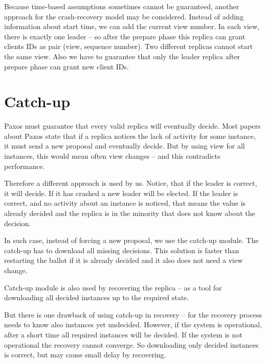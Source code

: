 Because time-based assumptions sometimes cannot be guaranteed, another approach for the crash-recovery model may be considered. Instead of adding information about start time, we can add the current view number. In each view, there is exactly one leader -- so after the prepare phase this replica can grant clients IDs as pair (view, sequence number). Two different replicas cannot start the same view.
Also we have to guarantee that only the leader replica after prepare phase can grant new client IDs.

\section{Catch-up}
\label{sec:catch_up}

Paxos must guarantee that every valid replica will eventually decide. Most papers about Paxos state that if a replica notices the lack of activity for some instance, it must send a new proposal and eventually decide. But by using view for all instances, this would mean often view changes -- and this contradicts performance.

Therefore a different approach is used by us. Notice, that if the leader is correct, it will decide. If it has crashed a new leader will be elected. If the leader is correct, and no activity about an instance is noticed, that means the value is already decided and the replica is in the minority that does not know about the decision.

In such case, instead of forcing a new proposal, we use the catch-up module.
The catch-up has to download all missing decisions. This solution is faster than restarting the ballot if it is already decided and it also does not need a view change.


Catch-up module is also used by recovering the replica -- as a tool for downloading all decided instances up to the required state.

But there is one drawback of using catch-up in recovery -- for the recovery process needs to know also instances yet undecided.  However, if the system is operational, after a short time all required instances will be decided. If the system is not operational the recovery cannot converge. So downloading only decided instances is correct, but may cause small delay by recovering.

